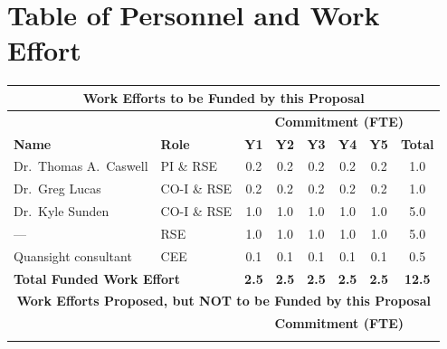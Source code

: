 \documentclass[12pt]{article}
\numberwithin{page}{section}
\begin{document}
\newpage



\newpage

\section{Table of Personnel and Work Effort}
\setcounter{page}{1}
\begin{tabular}{|l|l|c|c|c|c|c|c|}
  \hline
  \multicolumn{8}{|c|}{\cellcolor{gray!30}\textbf{Work Efforts to be Funded by this Proposal}}\\
  \hline
  \cellcolor{gray!30} &  \cellcolor{gray!30}&\multicolumn{6}{c|}{\cellcolor{gray!30}\textbf{Commitment (FTE)}} \\
  \hhline{|*2{>{\arrayrulecolor{gray!30}}-}*4{>{\arrayrulecolor{black}}-}|}
  \cellcolor{gray!30}\textbf{Name }& \cellcolor{gray!30}\textbf{Role} & \cellcolor{gray!30}\textbf{Y1} & \cellcolor{gray!30}\textbf{Y2} & \cellcolor{gray!30}\textbf{Y3}& \cellcolor{gray!30}\textbf{Y4}& \cellcolor{gray!30}\textbf{Y5} & \cellcolor{gray!30}\textbf{Total}     \\  \hline
  Dr.\ Thomas A.\ Caswell & PI \& RSE   & 0.2 & 0.2 & 0.2 & 0.2 & 0.2 & 1.0 \\  \hline
  Dr.\ Greg Lucas         & CO-I \& RSE & 0.2 & 0.2 & 0.2 & 0.2 & 0.2 & 1.0 \\  \hline
  Dr.\ Kyle Sunden        & CO-I \& RSE & 1.0 & 1.0 & 1.0 & 1.0 & 1.0 & 5.0 \\  \hline
  ---                     & RSE         & 1.0 & 1.0 & 1.0 & 1.0 & 1.0 & 5.0 \\  \hline
  Quansight consultant    & CEE         & 0.1 & 0.1 & 0.1 & 0.1 & 0.1 & 0.5 \\  \hline
  \multicolumn{2}{|l|}{\textbf{Total Funded Work Effort}} & \textbf{2.5}& \textbf{2.5}& \textbf{2.5}& \textbf{2.5}& \textbf{2.5} &  \textbf{12.5}\\    \hline
  \multicolumn{8}{|c|}{\cellcolor{gray!30}\textbf{Work Efforts Proposed, but NOT to be Funded by this Proposal}}\\  \hline
  \cellcolor{gray!30} &  \cellcolor{gray!30}&\multicolumn{6}{c|}{\cellcolor{gray!30}\textbf{Commitment (FTE)}} \\
  \hhline{|*2{>{\arrayrulecolor{gray!30}}-}*4{>{\arrayrulecolor{black}}-}|}

\end{tabular}
\end{document}

